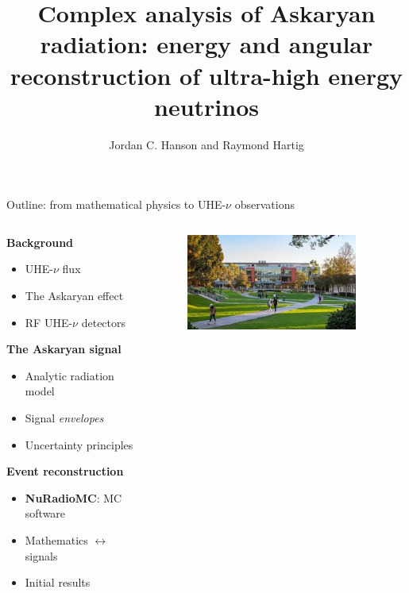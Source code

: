 \documentclass{beamer}
\title{Complex analysis of Askaryan radiation: energy and angular reconstruction of ultra-high energy neutrinos}
\author{Jordan C. Hanson and Raymond Hartig}
\institute{Dept. of Physics and Astronomy \\ Whittier College \\ Whittier, CA}
\begin{document}
\maketitle

\begin{frame}{Outline: from mathematical physics to UHE-$\nu$ observations}
\begin{columns}[T]
\begin{column}{0.5\textwidth}
\textbf{\alert{Background}}
\begin{itemize}
\item UHE-$\nu$ flux
\item The Askaryan effect
\item RF UHE-$\nu$ detectors
\end{itemize}
\textbf{\alert{The Askaryan signal}}
\begin{itemize}
\item Analytic radiation model
\item Signal \textit{envelopes}
\item Uncertainty principles
\end{itemize}
\textbf{\alert{Event reconstruction}}
\begin{itemize}
\item \textbf{NuRadioMC}: MC software
\item Mathematics $\leftrightarrow$ signals
\item Initial results
\end{itemize}
\end{column}
\begin{column}{0.5\textwidth}
\begin{figure}
\centering
\includegraphics[width=0.9\textwidth]{whittier3.jpeg}

\end{figure}
\end{column}
\end{columns}
\end{frame}
\end{document}
